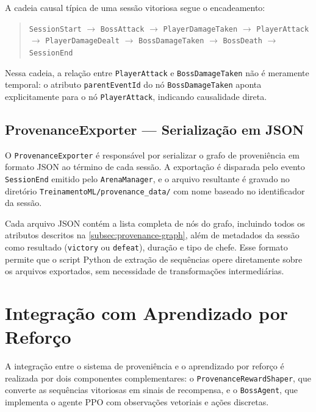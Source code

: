 A cadeia causal típica de uma sessão vitoriosa segue o encadeamento:

\begin{quote}
    \texttt{SessionStart} $\rightarrow$ \texttt{BossAttack} $\rightarrow$
    \texttt{PlayerDamageTaken} $\rightarrow$ \texttt{PlayerAttack}
    $\rightarrow$ \texttt{PlayerDamageDealt} $\rightarrow$
    \texttt{BossDamageTaken} $\rightarrow$ \texttt{BossDeath} $\rightarrow$
    \texttt{SessionEnd}
\end{quote}

Nessa cadeia, a relação entre \texttt{PlayerAttack} e
\texttt{BossDamageTaken} não é meramente temporal: o atributo
\texttt{parentEventId} do nó \texttt{BossDamageTaken} aponta explicitamente
para o nó \texttt{PlayerAttack}, indicando causalidade direta.

\subsection{ProvenanceExporter --- Serialização em JSON}
\label{subsec:provenance-exporter}

O \texttt{ProvenanceExporter} é responsável por serializar o grafo de
proveniência em formato JSON ao término de cada sessão. A exportação é
disparada pelo evento \texttt{SessionEnd} emitido pelo
\texttt{ArenaManager}, e o arquivo resultante é gravado no diretório
\texttt{TreinamentoML/provenance\_data/} com nome baseado no identificador
da sessão.

Cada arquivo JSON contém a lista completa de nós do grafo, incluindo todos os
atributos descritos na \autoref{subsec:provenance-graph}, além de metadados da
sessão como resultado (\texttt{victory} ou \texttt{defeat}), duração e tipo
de chefe. Esse formato permite que o script Python de extração de sequências
opere diretamente sobre os arquivos exportados, sem necessidade de
transformações intermediárias.

\section{Integração com Aprendizado por Reforço}
\label{sec:integracao-rl}

A integração entre o sistema de proveniência e o aprendizado por reforço é
realizada por dois componentes complementares: o
\texttt{ProvenanceRewardShaper}, que converte as sequências vitoriosas em
sinais de recompensa, e o \texttt{BossAgent}, que implementa o agente PPO
com observações vetoriais e ações discretas.


